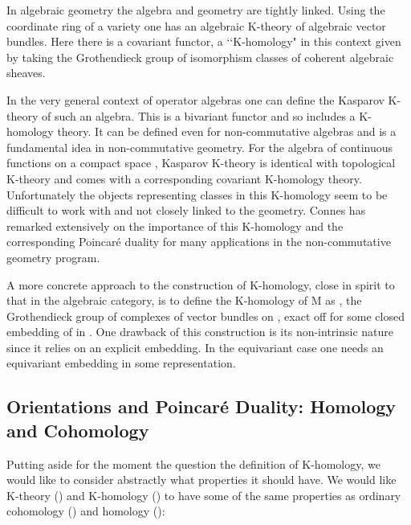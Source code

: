 \documentclass[a4paper,a4paper]{article}
\theoremstyle{conjecture}
\begin{document}
In algebraic geometry the algebra and geometry are tightly linked.
Using the coordinate ring of a variety one has an algebraic K-theory of
algebraic vector bundles.  Here there is a covariant functor, a \lq\lq K-homology"
in this context given by taking the Grothendieck group of isomorphism
classes of coherent algebraic sheaves.

In the very general context of operator algebras one can define the
Kasparov K-theory of such an algebra.  This is a bivariant functor
and so includes a K-homology theory.  It can be defined even for non-commutative
algebras and is a fundamental idea in non-commutative geometry.  For the
algebra of continuous functions on a compact space \coordHE{}, Kasparov K-theory
is identical with topological
K-theory and comes with a corresponding covariant K-homology theory.
Unfortunately the objects representing classes in this K-homology seem
to be difficult to work with and not closely linked to the geometry.
Connes \cite{Connes} has remarked extensively on the importance of this K-homology
and the corresponding Poincar\'e duality for many applications in the
non-commutative geometry program.

A more concrete approach to the construction of K-homology, close
in spirit to that in the algebraic category, is to define the K-homology
of M as \coordHE{},
the Grothendieck group of complexes of vector bundles on \coordHE{},
exact off \coordHE{} for some closed embedding of \coordHE{} in \coordHE{}.
One drawback of this construction is its non-intrinsic nature since
it relies on an explicit embedding.  In the equivariant case one
needs an equivariant embedding in some \coordHE{} representation.


\subsection {Orientations and Poincar\'e Duality: Homology and Cohomology}

Putting aside for the moment the question the definition of K-homology, we
would like to consider abstractly what properties it should have.  We would
like K-theory (\coordHE{}) and K-homology (\coordHE{}) to have some of the same properties as
ordinary cohomology (\coordHE{}) and homology (\coordHE{}):
\end{document}
